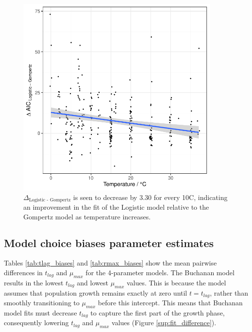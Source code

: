 \documentclass[11pt, a4paper]{article}
\begin{document}
\begin{linenumbers}
                \begin{figure}[H]
                \centering
        \includegraphics[width=4in]{../results/logistic_vs_gompertz_temp.pdf}
        \caption{$\Delta_{\text{Logistic - Gompertz}}$ is seen to decrease by 3.30 for every 10\degree C, indicating an improvement in the fit of the Logistic model relative to the Gompertz model as temperature increases.}
        \label{fig:logistic_temp}
        \end{figure}  

\subsection{Model choice biases parameter estimates}

Tables \ref{tab:tlag_biases} and \ref{tab:rmax_biases} show the mean pairwise differences in $t_{lag}$ and $\mu_{max}$ for the 4-parameter models. The Buchanan model results in the lowest $t_{lag}$ and lowest $\mu_{max}$ values. This is because the model assumes that population growth remains exactly at zero until $t = t_{lag}$, rather than smoothly transitioning to $\mu_{max}$ before this intercept. This means that Buchanan model fits must decrease $t_{lag}$ to capture the first part of the growth phase, consequently lowering $t_{lag}$ and $\mu_{max}$ values (Figure \ref{sup:fit_difference}).


\end{linenumbers}
\end{document}

